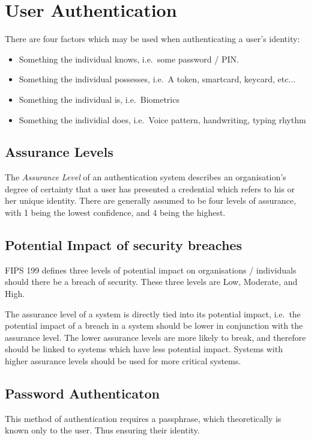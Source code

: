 \section{User Authentication}
There are four factors which may be used when authenticating a user's identity:
\begin{itemize}
	\item Something the individual knows, i.e.\ some password / PIN.
	\item Something the individual possesses, i.e.\  A token, smartcard, keycard, etc...
	\item Something the individual is, i.e.\ Biometrics
	\item Something the individial does, i.e.\ Voice pattern, handwriting, typing rhythm
\end{itemize}

\subsection{Assurance Levels}
The \textit{Assurance Level} of an authentication system describes an organisation's
degree of certainty that a user has presented a credential which refers to his or her unique
identity. There are generally assumed to be four levels of assurance, with 1 being the lowest
confidence, and 4 being the highest.

\subsection{Potential Impact of security breaches}
FIPS 199 defines three levels of potential impact on organisations / individuals should there
be a breach of security. These three levels are Low, Moderate, and High.

The assurance level of a system is directly tied into its potential impact, i.e.\ the
potential impact of a breach in a system should be lower in conjunction with the assurance
level. The lower assurance levels are more likely to break, and therefore should be linked
to systems which have less potential impact. Systems with higher assurance levels should
be used for more critical systems.

\subsection{Password Authenticaton}
This method of authentication requires a passphrase, which theoretically is known only
to the user. Thus ensuring their identity.

